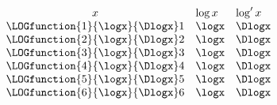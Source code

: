 $\begin{array}{cll}
x & \log x & \log' x \\
\LOGfunction{1}{\logx}{\Dlogx}
1 &\logx & \Dlogx\\
\LOGfunction{2}{\logx}{\Dlogx}
2 &\logx & \Dlogx\\
\LOGfunction{3}{\logx}{\Dlogx}
3 &\logx & \Dlogx\\
\LOGfunction{4}{\logx}{\Dlogx}
4 &\logx & \Dlogx\\
\LOGfunction{5}{\logx}{\Dlogx}
5 &\logx & \Dlogx\\
\LOGfunction{6}{\logx}{\Dlogx}
6 &\logx & \Dlogx
\end{array}$
